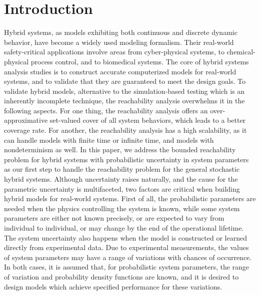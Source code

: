 \section{Introduction}  
Hybrid systems, as models exhibiting both continuous and discrete dynamic behavior, have become a widely used modeling formalism. Their real-world safety-critical applications involve areas from cyber-physical systems, to chemical-physical process control, and to biomedical systems. The core of hybrid systems analysis studies is to construct accurate computerized models for real-world systems, and to validate that they are guaranteed to meet the design goals. To validate hybrid models, alternative to the simulation-based testing which is an inherently incomplete technique, the reachability analysis overwhelms it in the following aspects. For one thing, the reachability analysis offers an over-approximative set-valued cover of all system behaviors, which leads to a better coverage rate. For another, the reachability analysis has a high scalability, as it can handle models with finite time or infinite time, and models with nondeterminism as well. In this paper, we address the bounded reachability problem for hybrid systems with probabilistic uncertainty in system parameters as our first step to handle the reachability problem for the general stochastic hybrid systems. Although uncertainty raises naturally, and the cause for the parametric uncertainty is multifaceted, two factors are critical when building hybrid models for real-world systems. First of all, the probabilistic parameters are needed when the physics controlling the system is known, while some system parameters are either not known precisely, or are expected to vary from individual to individual, or may change by the end of the operational lifetime. The system uncertainty also happens when the model is constructed or learned directly from experimental data. Due to experimental measurements, the values of system parameters may have a range of variations with chances of occurrence. In both cases, it is assumed that, for probabilistic system parameters, the range of variation and probability density functions are known, and it is desired to design models which achieve specified performance for these variations.   


